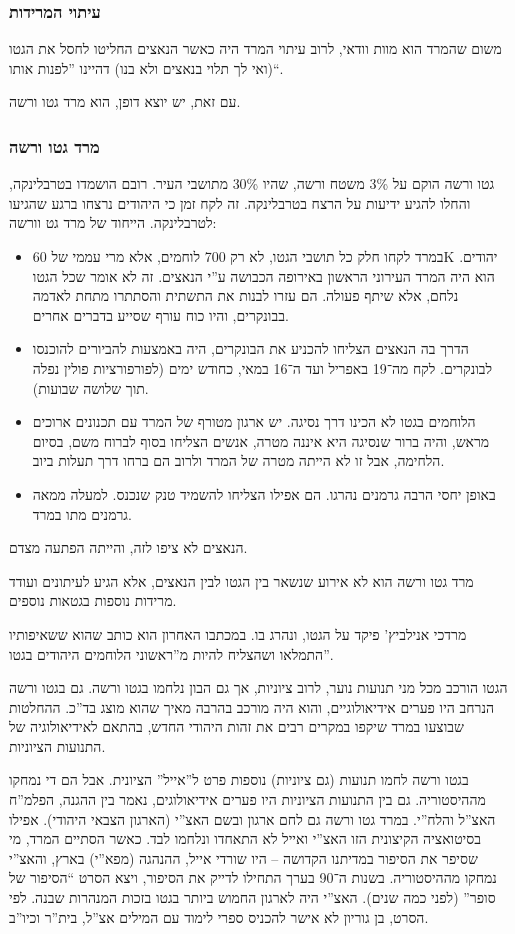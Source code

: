 \documentclass[a4paper]{book}
\begin{document}
	\subsubsection{עיתוי המרידות}
	משום שהמרד הוא מוות וודאי, לרוב עיתוי המרד היה כאשר הנאצים החליטו לחסל את הגטו (ואי לך תלוי בנאצים ולא בנו) דהיינו ''לפנות אותו``. 
	
	עם זאת, יש יוצא דופן, הוא מרד גטו ורשה. 
	
	\subsubsection{מרד גטו ורשה}
	גטו ורשה הוקם על 3\% משטח ורשה, שהיו 30\% מתושבי העיר. רובם הושמדו בטרבלינקה, והחלו להגיע ידיעות על הרצח בטרבלינקה. זה לקח זמן כי היהודים נרצחו ברגע שהגיעו לטרבלינקה. הייחוד של מרד גט וורשה: 
	\begin{itemize}
		\item במרד לקחו חלק כל תושבי הגטו, לא רק 700 לוחמים, אלא מרי עממי של 60K יהודים. הוא היה המרד העירוני הראשון באירופה הכבושה ע''י הנאצים. זה לא אומר שכל הגטו נלחם, אלא שיתף פעולה. הם עזרו לבנות את התשתית והסתתרו מתחת לאדמה בבונקרים, והיו כוח עורף שסייע בדברים אחרים. 
		\item הדרך בה הנאצים הצליחו להכניע את הבונקרים, היה באמצעות להביורים להוכנסו לבונקרים. לקח מה־19 באפריל ועד ה־16 במאי, כחודש ימים (לפורפורציות פולין נפלה תוך שלושה שבועות). 
		\item הלוחמים בגטו לא הכינו דרך נסיגה. יש ארגון מטורף של המרד עם תכנונים ארוכים מראש, והיה ברור שנסיגה היא איננה מטרה, אנשים הצליחו בסוף לברוח משם, בסיום הלחימה, אבל זו לא הייתה מטרה של המרד ולרוב הם ברחו דרך תעלות ביוב. 
		\item באופן יחסי הרבה גרמנים נהרגו. הם אפילו הצליחו להשמיד טנק שנכנס. למעלה ממאה גרמנים מתו במרד. 
	\end{itemize}
	הנאצים לא ציפו לזה, והייתה הפתעה מצדם. 
	
	מרד גטו ורשה הוא לא אירוע שנשאר בין הגטו לבין הנאצים, אלא הגיע לעיתונים ועודד מרידות נוספות בגטאות נוספים. 
	
	מרדכי אנילביץ' פיקד על הגטו, ונהרג בו. במכתבו האחרון הוא כותב שהוא ששאיפותיו התמלאו ושהצליח להיות מ''ראשוני הלוחמים היהודים בגטו''. 
	
	הגטו הורכב מכל מני תנועות נוער, לרוב ציוניות, אך גם הבון נלחמו בגטו ורשה. גם בגטו ורשה הנרחב היו פערים אידיאולוגיים, והוא היה מורכב בהרבה מאיך שהוא מוצג בד''כ. ההחלטות שבוצעו במרד שיקפו במקרים רבים את זהות היהודי החדש, בהתאם לאידיאולוגיה של התנועות הציוניות. 
	
	בגטו ורשה לחמו תנועות (גם ציוניות) נוספות פרט ל''אייל'' הציונית. אבל הם די נמחקו מההיסטוריה. גם בין התנועות הציוניות היו פערים אידיאולוגים, נאמר בין ההגנה, הפלמ''ח האצ''ל והלח''י. במרד גטו ורשה גם לחם ארגון ובשם האצ''י (הארגון הצבאי היהודי). אפילו בסיטואציה הקיצונית הזו האצ''י ואייל לא התאחדו ונלחמו לבד. כאשר הסתיים המרד, מי שסיפר את הסיפור במדיתנו הקדושה – היו שורדי אייל, ההנהגה (מפא''י) בארץ, והאצ''י נמחקו מההיסטוריה. בשנות ה־90 בערך התחילו לדייק את הסיפור, ויצא הסרט ``הסיפור של סופר'' (לפני כמה שנים). האצ''י היה לארגון החמוש ביותר בגטו בזכות המנהרות שבנה. לפי הסרט, בן גוריון לא אישר להכניס ספרי לימוד עם המילים אצ''ל, בית''ר וכיו''ב. 
	
\end{document}
